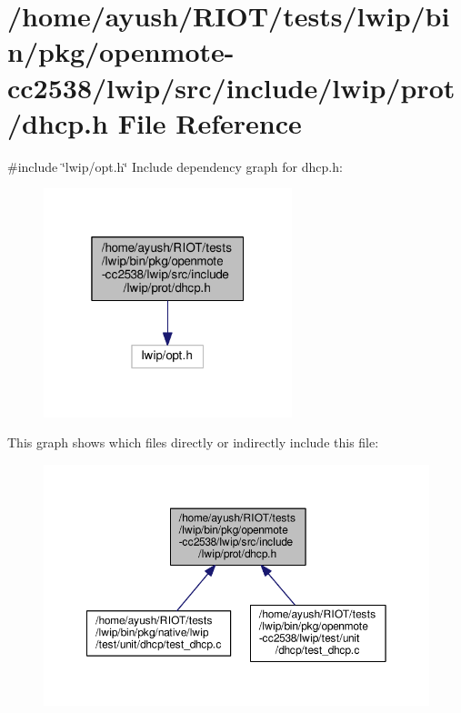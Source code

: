 \hypertarget{openmote-cc2538_2lwip_2src_2include_2lwip_2prot_2dhcp_8h}{}\section{/home/ayush/\+R\+I\+O\+T/tests/lwip/bin/pkg/openmote-\/cc2538/lwip/src/include/lwip/prot/dhcp.h File Reference}
\label{openmote-cc2538_2lwip_2src_2include_2lwip_2prot_2dhcp_8h}
{\ttfamily \#include \char`\"{}lwip/opt.\+h\char`\"{}}\newline
Include dependency graph for dhcp.\+h\+:
\nopagebreak
\begin{figure}[H]
\begin{center}
\leavevmode
\includegraphics[width=205pt]{openmote-cc2538_2lwip_2src_2include_2lwip_2prot_2dhcp_8h__incl}
\end{center}
\end{figure}
This graph shows which files directly or indirectly include this file\+:
\nopagebreak
\begin{figure}[H]
\begin{center}
\leavevmode
\includegraphics[width=350pt]{openmote-cc2538_2lwip_2src_2include_2lwip_2prot_2dhcp_8h__dep__incl}
\end{center}
\end{figure}
